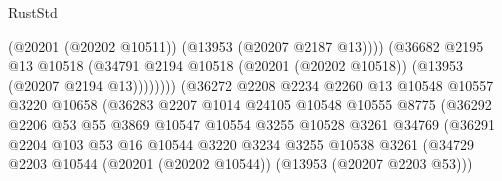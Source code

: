 \begin{lexlean}{RustStd}
\begin{coremodule}
                                              (@20201 (@20202 @10511))
                                              (@13953 (@20207 @2187 @13))))
                                          (@36682
                                            @2195
                                            @13
                                            @10518
                                            (@34791
                                              @2194
                                              @10518
                                              (@20201 (@20202 @10518))
                                              (@13953 (@20207 @2194 @13))))))))
                                  (@36272
                                    @2208
                                    @2234
                                    @2260
                                    @13
                                    @10548
                                    @10557
                                    @3220
                                    @10658
                                    (@36283
                                      @2207
                                      @1014
                                      @24105
                                      @10548
                                      @10555
                                      @8775
                                      (@36292
                                        @2206
                                        @53
                                        @55
                                        @3869
                                        @10547
                                        @10554
                                        @3255
                                        @10528
                                        @3261
                                        @34769
                                        (@36291
                                          @2204
                                          @103
                                          @53
                                          @16
                                          @10544
                                          @3220
                                          @3234
                                          @3255
                                          @10538
                                          @3261
                                          (@34729
                                            @2203
                                            @10544
                                            (@20201 (@20202 @10544))
                                            (@13953 (@20207 @2203 @53)))

\end{coremodule}
\end{lexlean}
